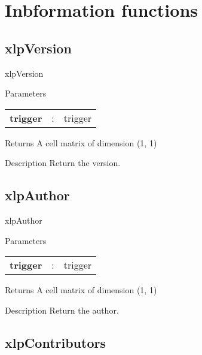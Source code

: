 \section{Inbformation functions}

\subsection{xlpVersion}

\begin{xlpfunctitle}{xlpVersion}
\begin{xlpfunc}{Parameters}
\begin{tabular}{p{3.5cm}cl}
\textbf{trigger}& : & trigger \\
\end{tabular}
\end{xlpfunc}


\begin{xlpfunc}{Returns}
A cell matrix of dimension (1, 1)
\end{xlpfunc}

\begin{xlpfunc}{Description}
Return the \xlp version.
\end{xlpfunc}
\end{xlpfunctitle}


\subsection{xlpAuthor}

\begin{xlpfunctitle}{xlpAuthor}
\begin{xlpfunc}{Parameters}
\begin{tabular}{p{3.5cm}cl}
\textbf{trigger}& : & trigger \\
\end{tabular}
\end{xlpfunc}


\begin{xlpfunc}{Returns}
A cell matrix of dimension (1, 1)
\end{xlpfunc}

\begin{xlpfunc}{Description}
Return the \xlp author.
\end{xlpfunc}
\end{xlpfunctitle}

\subsection{xlpContributors}


